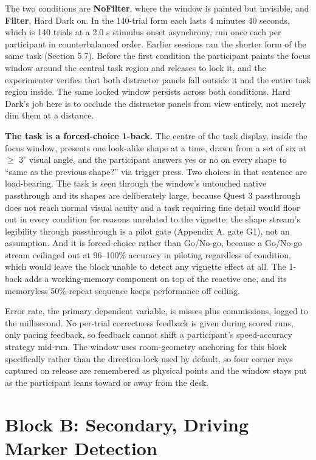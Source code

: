 The two conditions are \textbf{NoFilter}, where the window is painted but invisible, and
\textbf{Filter}, Hard Dark on. In the 140-trial form each lasts 4 minutes 40 seconds, which is
140 trials at a 2.0 s stimulus onset asynchrony, run once each per participant in counterbalanced
order. Earlier sessions ran the shorter form of the same task (Section 5.7). Before the first
condition the participant paints the focus window around the central task region and releases to
lock it, and the experimenter verifies that both distractor panels fall outside it and the entire
task region inside. The same locked window persists across both conditions. Hard Dark's job here is
to occlude the distractor panels from view entirely, not merely dim them at a distance.

\textbf{The task is a forced-choice 1-back.} The centre of the task display, inside the focus
window, presents one look-alike shape at a time, drawn from a set of six at $\geq$ 3$^{\circ}$
visual angle, and the participant answers yes or no on every shape to ``same as the previous shape?''
via trigger press. Two choices in that sentence are load-bearing. The task is seen through the
window's untouched native passthrough and its shapes are deliberately large, because Quest 3
passthrough does not reach normal visual acuity and a task requiring fine detail would floor out in
every condition for reasons unrelated to the vignette; the shape stream's legibility through
passthrough is a pilot gate (Appendix A, gate G1), not an assumption. And it is forced-choice
rather than Go/No-go, because a Go/No-go stream ceilinged out at
96--100\% accuracy in piloting regardless of condition, which would leave the block unable to detect
any vignette effect at all. The 1-back adds a working-memory component on top of the reactive one,
and its memoryless 50\%-repeat sequence keeps performance off ceiling.

Error rate, the primary dependent variable, is misses plus commissions, logged to the millisecond. No
per-trial correctness feedback is given during scored runs, only pacing feedback, so feedback cannot
shift a participant's speed-accuracy strategy mid-run. The window uses room-geometry anchoring for
this block specifically rather than the direction-lock used by default, so four corner rays captured
on release are remembered as physical points and the window stays put as the participant leans toward
or away from the desk.

\section{Block B: Secondary, Driving Marker Detection}

